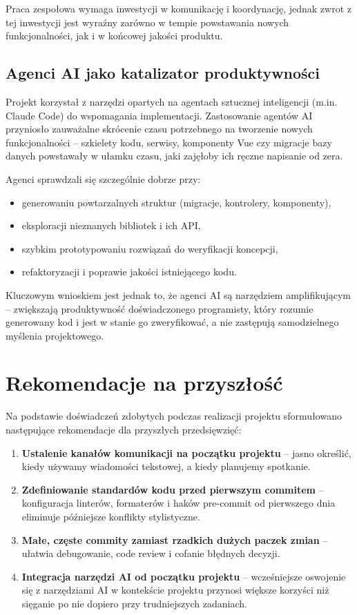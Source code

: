 \documentclass[12pt,a4paper]{report}
\begin{document}
Praca zespołowa wymaga inwestycji w komunikację i koordynację, jednak zwrot z tej inwestycji jest wyraźny zarówno w tempie powstawania nowych funkcjonalności, jak i w końcowej jakości produktu.

\subsection{Agenci AI jako katalizator produktywności}

Projekt korzystał z narzędzi opartych na agentach sztucznej inteligencji (m.in. Claude Code) do wspomagania implementacji. Zastosowanie agentów AI przyniosło zauważalne skrócenie czasu potrzebnego na tworzenie nowych funkcjonalności -- szkielety kodu, serwisy, komponenty Vue czy migracje bazy danych powstawały w ułamku czasu, jaki zajęłoby ich ręczne napisanie od zera.

Agenci sprawdzali się szczególnie dobrze przy:
\begin{itemize}[noitemsep]
    \item generowaniu powtarzalnych struktur (migracje, kontrolery, komponenty),
    \item eksploracji nieznanych bibliotek i ich API,
    \item szybkim prototypowaniu rozwiązań do weryfikacji koncepcji,
    \item refaktoryzacji i poprawie jakości istniejącego kodu.
\end{itemize}

Kluczowym wnioskiem jest jednak to, że agenci AI są narzędziem amplifikującym -- zwiększają produktywność doświadczonego programisty, który rozumie generowany kod i jest w stanie go zweryfikować, a nie zastępują samodzielnego myślenia projektowego.

\section{Rekomendacje na przyszłość}

Na podstawie doświadczeń zdobytych podczas realizacji projektu sformułowano następujące rekomendacje dla przyszłych przedsięwzięć:

\begin{enumerate}
    \item \textbf{Ustalenie kanałów komunikacji na początku projektu} -- jasno określić, kiedy używamy wiadomości tekstowej, a kiedy planujemy spotkanie.
    \item \textbf{Zdefiniowanie standardów kodu przed pierwszym commitem} -- konfiguracja linterów, formaterów i haków pre-commit od pierwszego dnia eliminuje późniejsze konflikty stylistyczne.
    \item \textbf{Małe, częste commity zamiast rzadkich dużych paczek zmian} -- ułatwia debugowanie, code review i cofanie błędnych decyzji.
    \item \textbf{Integracja narzędzi AI od początku projektu} -- wcześniejsze oswojenie się z narzędziami AI w kontekście projektu przynosi większe korzyści niż sięganie po nie dopiero przy trudniejszych zadaniach.
\end{enumerate}
\end{document}
